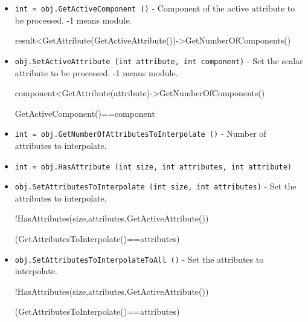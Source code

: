 \begin{itemize}
 

\item  \verb|int = obj.GetActiveComponent ()| -  Component of the active attribute to be processed. -1 means module.
 
 
       result<GetAttribute(GetActiveAttribute())->GetNumberOfComponents()

\item  \verb|obj.SetActiveAttribute (int attribute, int component)| -  Set the scalar attribute to be processed. -1 means module.
 
 
 
              component<GetAttribute(attribute)->GetNumberOfComponents()
 
               GetActiveComponent()==component

\item  \verb|int = obj.GetNumberOfAttributesToInterpolate ()| -  Number of attributes to interpolate.
 
 

\item  \verb|int = obj.HasAttribute (int size, int attributes, int attribute)|

\item  \verb|obj.SetAttributesToInterpolate (int size, int attributes)| -  Set the attributes to interpolate.
 
 
 
 
                     !HasAttributes(size,attributes,GetActiveAttribute())
 
               (GetAttributesToInterpolate()==attributes)

\item  \verb|obj.SetAttributesToInterpolateToAll ()| -  Set the attributes to interpolate.
 
 
 
 
                     !HasAttributes(size,attributes,GetActiveAttribute())
 
               (GetAttributesToInterpolate()==attributes)

\end{itemize}
